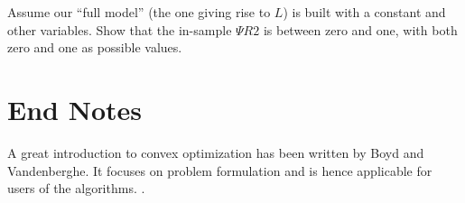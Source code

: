 \begin{exercise}
  Assume our ``full model'' (the one giving rise to $L$) is built with a constant and other variables.  Show that the in-sample $\Psi R2$ is between zero and one, with both zero and one as possible values.
\end{exercise}

\section{End Notes}

A great introduction to convex optimization has been written by Boyd and Vandenberghe.  It focuses on problem formulation and is hence applicable for users of the algorithms. \cite{BoydConvexOpt}.
